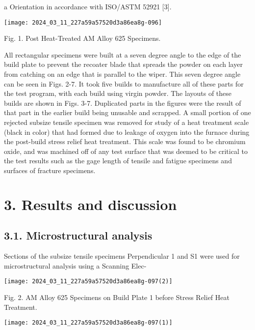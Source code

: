\documentclass[10pt]{article}
\begin{document}
a Orientation in accordance with ISO/ASTM 52921 [3].

\begin{center}
\texttt{[image: 2024\_03\_11\_227a59a57520d3a86ea8g-096]}
\end{center}

Fig. 1. Post Heat-Treated AM Alloy 625 Specimens.

All rectangular specimens were built at a seven degree angle to the edge of the build plate to prevent the recoater blade that spreads the powder on each layer from catching on an edge that is parallel to the wiper. This seven degree angle can be seen in Figs. 2-7. It took five builds to manufacture all of these parts for the test program, with each build using virgin powder. The layouts of these builds are shown in Figs. 3-7. Duplicated parts in the figures were the result of that part in the earlier build being unusable and scrapped. A small portion of one rejected subsize tensile specimen was removed for study of a heat treatment scale (black in color) that had formed due to leakage of oxygen into the furnace during the post-build stress relief heat treatment. This scale was found to be chromium oxide, and was machined off of any test surface that was deemed to be critical to the test results such as the gage length of tensile and fatigue specimens and surfaces of fracture specimens.

\section*{3. Results and discussion}
\subsection*{3.1. Microstructural analysis}
Sections of the subsize tensile specimens Perpendicular 1 and S1 were used for microstructural analysis using a Scanning Elec-

\begin{center}
\texttt{[image: 2024\_03\_11\_227a59a57520d3a86ea8g-097(2)]}
\end{center}

Fig. 2. AM Alloy 625 Specimens on Build Plate 1 before Stress Relief Heat Treatment.

\begin{center}
\texttt{[image: 2024\_03\_11\_227a59a57520d3a86ea8g-097(1)]}
\end{center}
\end{document}
